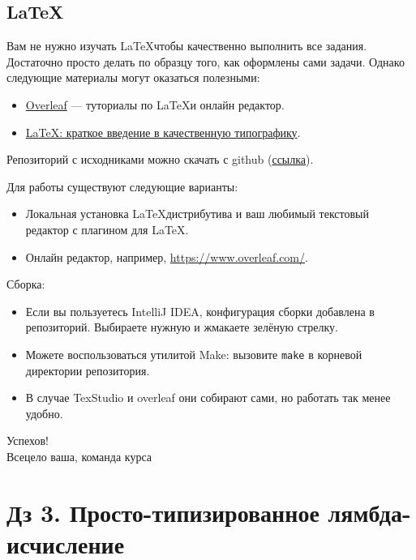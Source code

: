 \documentclass{article}
\begin{document}
    \subsection*{\LaTeX}

    Вам не нужно изучать \LaTeX чтобы качественно выполнить все задания.
    Достаточно просто делать по образцу того, как оформлены сами задачи.
    Однако следующие материалы могут оказаться полезными:

    \begin{itemize}
        \item \href{https://www.overleaf.com/learn}{Overleaf} --- туториалы по \LaTeX и онлайн редактор.
        \item \href{https://youtu.be/NOslSvJs29I}{LaTeX: краткое введение в качественную типографику}.
    \end{itemize}

    Репозиторий с исходниками можно скачать с github (\href{https://github.com/mse-fp2023/calculus-hws}{ссылка}).

    Для работы существуют следующие варианты:
    \begin{itemize}
        \item Локальная установка \LaTeX дистрибутива и ваш любимый текстовый редактор с плагином для \LaTeX.
        \item Онлайн редактор, например, \url{https://www.overleaf.com/}.
    \end{itemize}

    Сборка:
    \begin{itemize}
        \item Если вы пользуетесь IntelliJ IDEA, конфигурация сборки добавлена в репозиторий.
        Выбираете нужную и жмакаете зелёную стрелку.
        \item Можете воспользоваться утилитой Make: вызовите \texttt{make} в корневой директории репозитория.
        \item В случае TexStudio и overleaf они собирают сами, но работать так менее удобно.
    \end{itemize}

    \begin{flushright}
        Успехов! \\
        Всецело ваша, команда курса
    \end{flushright}

    \newpage


    \section*{Дз 3. Просто-типизированное лямбда-исчисление}
\end{document}

